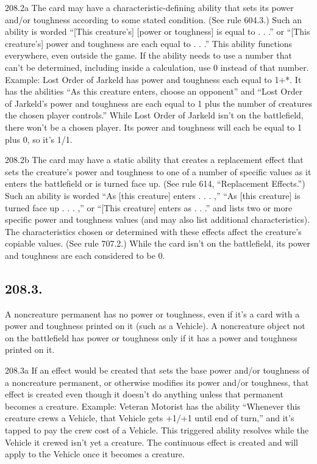 208.2a The card may have a characteristic-defining ability that sets its power and/or toughness according to some stated condition. (See rule 604.3.) Such an ability is worded “[This creature’s] [power or toughness] is equal to . . .” or “[This creature’s] power and toughness are each equal to . . .” This ability functions everywhere, even outside the game. If the ability needs to use a number that can’t be determined, including inside a calculation, use 0 instead of that number.
Example: Lost Order of Jarkeld has power and toughness each equal to 1+*. It has the abilities “As this creature enters, choose an opponent” and “Lost Order of Jarkeld’s power and toughness are each equal to 1 plus the number of creatures the chosen player controls.” While Lost Order of Jarkeld isn’t on the battlefield, there won’t be a chosen player. Its power and toughness will each be equal to 1 plus 0, so it’s 1/1.

208.2b The card may have a static ability that creates a replacement effect that sets the creature’s power and toughness to one of a number of specific values as it enters the battlefield or is turned face up. (See rule 614, “Replacement Effects.”) Such an ability is worded “As [this creature] enters . . . ,” “As [this creature] is turned face up . . . ,” or “[This creature] enters as . . .” and lists two or more specific power and toughness values (and may also list additional characteristics). The characteristics chosen or determined with these effects affect the creature’s copiable values. (See rule 707.2.) While the card isn’t on the battlefield, its power and toughness are each considered to be 0.

\subsection*{208.3.}
A noncreature permanent has no power or toughness, even if it’s a card with a power and toughness printed on it (such as a Vehicle). A noncreature object not on the battlefield has power or toughness only if it has a power and toughness printed on it.

208.3a If an effect would be created that sets the base power and/or toughness of a noncreature permanent, or otherwise modifies its power and/or toughness, that effect is created even though it doesn’t do anything unless that permanent becomes a creature.
Example: Veteran Motorist has the ability “Whenever this creature crews a Vehicle, that Vehicle gets +1/+1 until end of turn,” and it’s tapped to pay the crew cost of a Vehicle. This triggered ability resolves while the Vehicle it crewed isn’t yet a creature. The continuous effect is created and will apply to the Vehicle once it becomes a creature.

